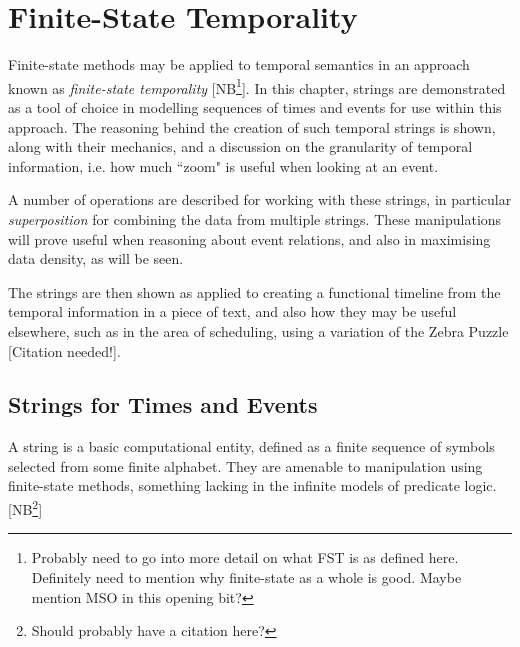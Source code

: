\documentclass[a4paper,12pt,leqno]{article}
\newcommand{\citeneeded}[1][]{{\color{red}[Citation needed!#1]}}
\newcommand{\selfnote}[1]{{\color{red}[NB\footnote{{\color{red}#1}}]}}
\newcommand{\nb}{\selfnote}
\begin{document}
\newpage
\section{Finite-State Temporality}\label{sec:fst}
Finite-state methods may be applied to temporal semantics in an approach known as \textit{finite-state temporality} \citep{fernando2005entailments} \selfnote{Probably need to go into more detail on what FST is as defined here. Definitely need to mention why finite-state as a whole is good. Maybe mention MSO in this opening bit?}. In this chapter, strings are demonstrated as a tool of choice in modelling sequences of times and events for use within this approach. The reasoning behind the creation of such temporal strings is shown, along with their mechanics, and a discussion on the granularity of temporal information, i.e. how much ``zoom" is useful when looking at an event.

A number of operations are described for working with these strings, in particular \textit{superposition} for combining the data from multiple strings. These manipulations will prove useful when reasoning about event relations, and also in maximising data density, as will be seen.

The strings are then shown as applied to creating a functional timeline from the temporal information in a piece of text, and also how they may be useful elsewhere, such as in the area of scheduling, using a variation of the Zebra Puzzle \citeneeded{}.

\subsection{Strings for Times and Events}\label{sub:strings}
A string is a basic computational entity, defined as a finite sequence of symbols selected from some finite alphabet. They are amenable to manipulation using finite-state methods, something lacking in the infinite models of predicate logic. \nb{Should probably have a citation here?}
\end{document}
